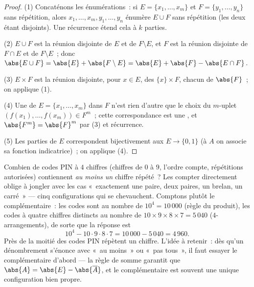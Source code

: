 \begin{proof}
(1) Concaténons les énumérations~: si $E = \{x_1, \dots, x_m\}$ et $F =
\{y_1, \dots, y_n\}$ sans répétition, alors $x_1, \dots, x_m, y_1,
\dots, y_n$ énumère $E \cup F$ sans répétition (les deux 
étant disjoints).
Une récurrence étend cela à $k$ parties.

(2) $E \cup F$ est la réunion disjointe de $E$ et de $F \setminus E$, et
$F$ est la réunion disjointe de $F \cap E$ et de $F \setminus E$~; donc
$\abs{E \cup F} = \abs{E} + \abs{F \setminus E} = \abs{E} + \abs{F} -
\abs{E \cap F}$.

(3) $E \times F$ est la réunion disjointe, pour $x \in E$, des 
$\{x\} \times F$, chacun de  $\abs{F}$~; on applique (1).

(4) Une  de $E = \{x_1, \dots, x_m\}$ dans $F$ n'est rien
d'autre que le choix du $m$-uplet $(f(x_1), \dots, f(x_m)) \in F^m$~; cette
correspondance est une , et $\abs{F^m} = \abs{F}^m$ par (3) et
récurrence.

(5) Les parties de $E$ correspondent bijectivement aux  $E \to \{0, 1\}$
(à $A$ on associe sa fonction indicatrice)~; on applique (4).
\end{proof}

\begin{example}\label{ex:b1:counting:complement}
Combien de codes PIN à $4$ chiffres (chiffres de $0$ à $9$, l'ordre
compte, répétitions autorisées) contiennent \emph{au moins un} chiffre
répété~? Les compter directement oblige à jongler avec les cas
«~exactement une paire, deux paires, un brelan, un carré~» --- cinq
configurations qui se chevauchent. Comptons plutôt le complémentaire~:
les codes sont au nombre de $10^4 = 10\,000$ (règle du produit), les
codes à quatre chiffres distincts au nombre de
$10 \times 9 \times 8 \times 7 = 5\,040$
($4$-arrangements), de sorte que la réponse est
\[
10^4 - 10 \cdot 9 \cdot 8 \cdot 7 = 10\,000 - 5\,040 = 4\,960 .
\]
Près de la moitié des codes PIN répètent un chiffre. L'idée à
retenir~: dès qu'un dénombrement s'énonce avec «~au moins~» ou
«~pas tous~», il faut essayer le complémentaire d'abord --- la règle
de somme garantit que $\abs{A} = \abs{E} - \abs{\overline A}$, et le
complémentaire est souvent une unique configuration bien propre.
\end{example}

